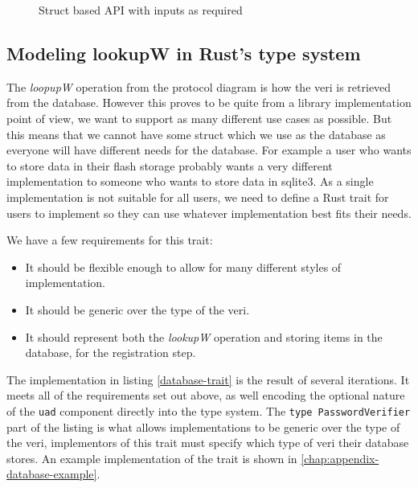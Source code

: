 \begin{figure}[H]

  \caption{Struct based API with inputs as required}
  \label{fig:actual-lib-structure}
\end{figure}

\subsection{Modeling lookupW in Rust's type system}
The \textit{loopupW} operation from the protocol diagram is how the \gls{veri} is retrieved from the database.
However this proves to be quite from a library implementation point of view, we want to support as many different use cases as possible.
But this means that we cannot have some struct which we use as the database as everyone will have different needs for the database.
For example a user who wants to store data in their flash storage probably wants a very different implementation to someone who wants to store data in sqlite3.
As a single implementation is not suitable for all users, we need to define a Rust trait for users to implement so they can use whatever implementation best fits their needs.

We have a few requirements for this trait:
\begin{itemize}
  \item{It should be flexible enough to allow for many different styles of implementation.}
  \item{It should be generic over the type of the \gls{veri}.}
  \item{It should represent both the \textit{lookupW} operation and storing items in the database, for the registration step.}
\end{itemize}


The implementation in listing \ref{database-trait} is the result of several iterations.
It meets all of the requirements set out above, as well encoding the optional nature of the \texttt{uad} component directly into the type system.
The \texttt{type PasswordVerifier} part of the listing is what allows implementations to be generic over the type of the \gls{veri}, implementors of this trait must specify which type of \gls{veri} their database stores.
An example implementation of the trait is shown in \cref{chap:appendix-database-example}.

